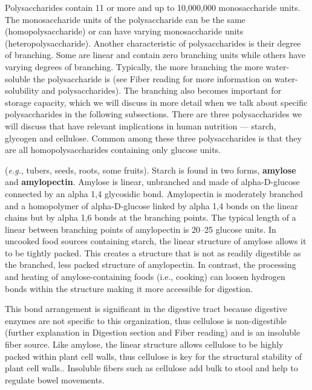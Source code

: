 \documentclass{tufte-handout}
\begin{document}
Polysaccharides contain 11 or more and up to 10,000,000 monosaccharide units. The monosaccharide units of the polysaccharide can be the same (homopolysaccharide) or can have varying monosaccharide units  (heteropolysaccharide). Another characteristic of polysaccharides is their degree of branching. Some are linear and contain zero branching units while others have varying degrees of branching. Typically, the more branching the more water-soluble the polysaccharide is (see Fiber reading for more information on water-solubility and polysaccharides). The branching also becomes important for storage capacity, which we will discuss in more detail when we talk about specific polysaccharides in the following subsections. There are three polysaccharides we will discuss that have relevant implications in human nutrition --- starch, glycogen and cellulose. Common among these three polysaccharides is that they are all homopolysaccharides containing only glucose units.

 (\textit{e.g.}, tubers, seeds, roots, some fruits). Starch is found in two forms, \textbf{amylose} and \textbf{amylopectin}. Amylose is linear, unbranched and made of alpha-D-glucose connected by an alpha 1,4 glycosidic bond. Amylopectin is moderately branched and a homopolymer of alpha-D-glucose linked by alpha 1,4 bonds on the linear chains but by alpha 1,6 bonds at the branching points. The typical length of a linear  between branching points of amylopectin is 20--25 glucose units. In uncooked food sources containing starch, the linear structure of amylose allows it to be tightly packed. This creates a structure that is not as readily digestible as the branched, less packed structure of amylopectin. In contrast, the processing and heating of amylose-containing foods (i.e., cooking) can loosen hydrogen bonds within the structure making it more accessible for digestion.

 This bond arrangement is significant in the digestive
tract because digestive enzymes are not specific to this organization, thus cellulose is non-digestible (further explanation in Digestion section and Fiber reading) and is an insoluble fiber source. Like amylose, the linear structure allows cellulose to be highly packed within plant cell walls, thus cellulose is key for the structural stability of plant cell walls..  Insoluble fibers such as cellulose add bulk to stool and help to regulate bowel movements.
\end{document}
